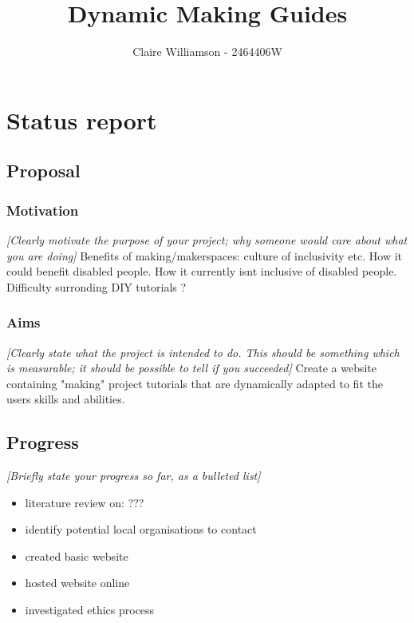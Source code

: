 \documentclass[11pt]{article}
\title{ Dynamic Making Guides }
\author{ Claire Williamson - 2464406W }
\begin{document}
    \maketitle
    
    
     

\section{Status report}

\subsection{Proposal}\label{proposal}

\subsubsection{Motivation}\label{motivation}

\emph{{[}Clearly motivate the purpose of your project; why someone would
care about what you are doing{]}}
Benefits of making/makerspaces: culture of inclusivity etc.
How it could benefit disabled people. How it currently isnt inclusive of disabled people.
Difficulty surronding DIY tutorials ? 

\subsubsection{Aims}\label{aims}

\emph{{[}Clearly state what the project is intended to do. This should
be something which is measurable; it should be possible to tell if you
succeeded{]}} 
Create a website containing "making" project tutorials that are dynamically
adapted to fit the users skills and abilities. 

\subsection{Progress}\label{progress}

\emph{{[}Briefly state your progress so far, as a bulleted list{]}}
\begin{itemize}
    \item literature review on: ???
    \item identify potential local organisations to contact 
    \item created basic website
    \item hosted website online
    \item investigated ethics process
\end{itemize}
\end{document}
